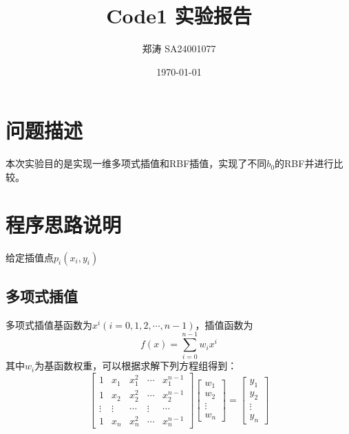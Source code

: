 \documentclass{article}
\title{Code1 实验报告}
\author{郑涛 SA24001077}
\date{\today}
\begin{document}
	\maketitle
	\section{问题描述}
	本次实验目的是实现一维多项式插值和RBF插值，实现了不同$b_0$的RBF并进行比较。
	\section{程序思路说明}
	给定插值点$p_i(x_i,y_i)$
	\subsection{多项式插值}
	多项式插值基函数为$x^i(i=0,1,2,\cdots,n-1)$，插值函数为
	$$f(x)=\sum_{i=0}^{n-1}w_ix^i$$
	其中$w_i$为基函数权重，可以根据求解下列方程组得到：
	\begin{equation}
		\left[
		\begin{array}{ccccc}
			1      & x_1    & x_1^2 & \cdots&x_1^{n-1}\\
			1      & x_2    & x_2^2 & \cdots&x_2^{n-1}\\
			\vdots & \vdots & \cdots& \vdots&\cdots\\
			1      & x_n    & x_n^2 & \cdots&x_n^{n-1}
		\end{array}
		\right]
		\left[
		\begin{array}{c}
			w_1     \\
			w_2     \\
			\vdots\\
			w_n     
		\end{array}
		\right]
		=
		\left[
		\begin{array}{c}
			y_1     \\
			y_2     \\
			\vdots\\
			y_n     
		\end{array}
		\right]
	\end{equation}
\end{document}
